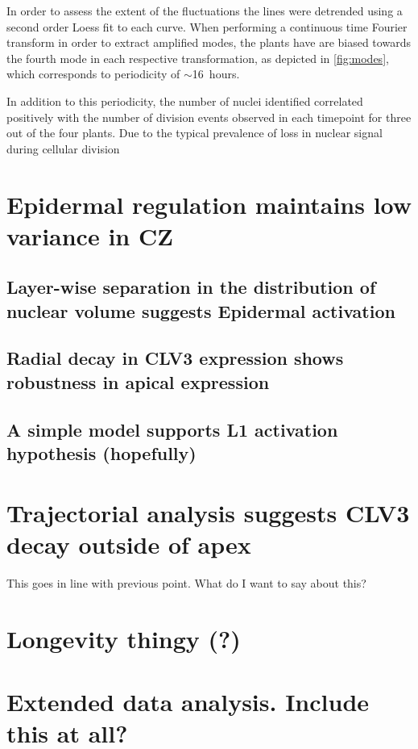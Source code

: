 In order to assess the extent of the fluctuations the lines were detrended using
a second order Loess fit to each curve. When performing a continuous time
Fourier transform in order to extract amplified modes, the plants have are
biased towards the fourth mode in each respective transformation, as depicted in
\cref{fig:modes}, which corresponds to periodicity of $\sim$16~hours. \FIG
{}

In addition to this periodicity, the number of nuclei identified correlated
positively with the number of division events observed in each timepoint for
three out of the four plants. Due to the typical prevalence of loss in nuclear
signal during cellular division




\section{Epidermal regulation maintains low variance in CZ}

\subsection{Layer-wise separation in the distribution of nuclear volume 
  suggests Epidermal activation}

\subsection{Radial decay in CLV3 expression shows robustness in apical expression}

\subsection{A simple model supports L1 activation hypothesis (hopefully)}

\section{Trajectorial analysis suggests CLV3 decay outside of apex}
This goes in line with previous point. What do I want to say about this? 

\section{Longevity thingy (?)}

\section{Extended data analysis. Include this at all?} 
